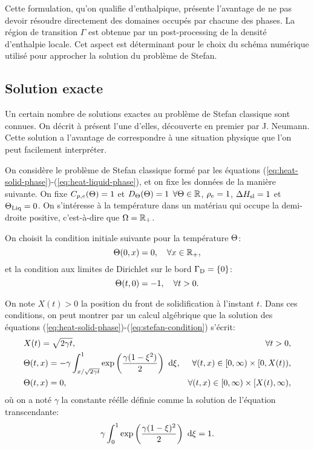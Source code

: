Cette formulation, qu'on qualifie d'enthalpique, présente l'avantage
de ne pas devoir résoudre directement des domaines occupés par chacune
des phases. La région de transition $\Gamma$ est obtenue par un
post-processing de la densité d'enthalpie locale. Cet aspect est
déterminant pour le choix du schéma numérique utilisé pour approcher
la solution du problème de Stefan.


\subsection*{Solution exacte}
Un certain nombre de solutions exactes au problème de Stefan
classique sont connues. On décrit à présent l'une d'elles, découverte en
premier par J. Neumann. Cette solution a l'avantage de correspondre à
une situation physique que l'on peut facilement interpréter.

On considère le problème de Stefan classique formé par les équations
(\ref{eq:heat-solid-phase})-(\ref{eq:heat-liquid-phase}), et on fixe
les données de la manière suivante. On fixe
$C_{p,e}(\Theta) = 1$ et
$D_\Theta(\Theta)=1$ $\forall\Theta \in \mathbb
R$, $\rho_\mathrm{e} = 1$, $\Delta H_\mathrm{sl} = 1$ et $\Theta_\text{Liq} =
0$. On s'intéresse à la température dans un matériau qui occupe la
demi-droite positive, c'est-à-dire que $\Omega = \mathbb R_+$.

On choisit la condition initiale suivante pour la température
$\Theta$:
\begin{equation}
  \Theta(0, x) = 0, \quad \forall x\in\mathbb R_+,
\end{equation}
et la condition aux limites de Dirichlet sur le bord $\Gamma_\mathrm{D} =
\left\{ 0 \right\}$:
\begin{equation}
  \Theta(t, 0) = -1, \quad \forall t > 0.
\end{equation}

On note $X(t) > 0$ la position du front de solidification à l'instant
$t$. Dans ces conditions, on peut montrer par un calcul algébrique que
la solution des équations
(\ref{eq:heat-solid-phase})-(\ref{eq:stefan-condition}) s'écrit:
\begin{align}
  & X(t) = \sqrt{2\gamma t},& \forall t > 0,\label{eq:neumann-sol-frontier}\\
  & \temperature(t, x) = -\gamma\int_{x / \sqrt{2\gamma
      t}}^1\exp\parent{\frac{\gamma(1 - \xi^2)}{2}}\, \intd{\xi},%
  & \forall (t, x) \in [0,\infty)\times[0,X(t)),\label{eq:neumann-sol-solid-phase}\\
    & \temperature(t, x) = 0,
    & \forall (t, x) \in [0,\infty)\times[X(t), \infty),\label{eq:neumann-sol-liquid-phase}
\end{align}
où on a noté $\gamma$ la constante réélle définie comme la solution de
l'équation transcendante:
\begin{equation}
  \gamma \int_0^1\exp\left( \frac{\gamma(1 - \xi)^2}{2} \right)\,\,\mathrm d\xi
  = 1.
\end{equation}


